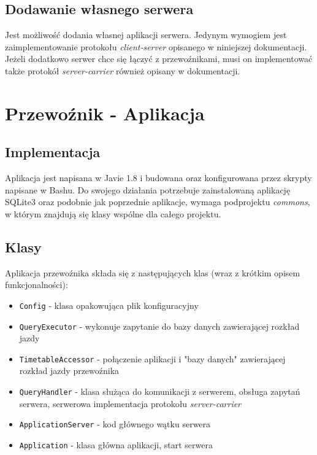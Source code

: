 \documentclass[pdftex,13pt,a4paper]{article}
\begin{document}
\subsection{Dodawanie własnego serwera}
Jest możliwość dodania własnej aplikacji serwera. Jedynym wymogiem jest zaimplementowanie protokołu \textit{client-server} opisanego w niniejszej dokumentacji. Jeżeli dodatkowo serwer chce się łączyć z przewoźnikami, musi on implementować także protokół \textit{server-carrier} również opisany w dokumentacji.

\section{Przewoźnik - Aplikacja}

\subsection{Implementacja}

Aplikacja jest napisana w Javie 1.8 i budowana oraz konfigurowana przez skrypty napisane w Bashu. Do swojego działania potrzebuje zainstalowaną aplikację SQLite3 oraz podobnie jak poprzednie aplikacje, wymaga podprojektu \emph{commons}, w którym znajdują się klasy wspólne dla całego projektu.

\subsection{Klasy}
Aplikacja przewoźnika składa się z następujących klas (wraz z krótkim opisem funkcjonalności):
\begin{itemize}

\item \texttt{Config} - klasa opakowująca plik konfiguracyjny
\item \texttt{QueryExecutor} - wykonuje zapytanie do bazy danych zawierającej rozkład jazdy
\item \texttt{TimetableAccessor} - połączenie aplikacji i "bazy danych" zawierającej rozkład jazdy przewoźnika
\item \texttt{QueryHandler} - klasa służąca do komunikacji z serwerem, obsługa zapytań serwera, serwerowa implementacja protokołu \textit{server-carrier}
\item \texttt{ApplicationServer} - kod głównego wątku serwera
\item \texttt{Application} - klasa główna aplikacji, start serwera
\end{itemize}
\end{document}
